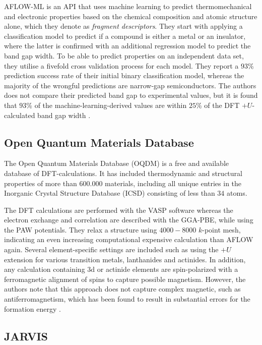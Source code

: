 AFLOW-ML \cite{Isayev2017} is an API that uses machine learning to predict thermomechanical and electronic properties based on the chemical composition and atomic structure alone, which they denote as \textit{fragment descriptors}. They start with applying a classification model to predict if a compound is either a metal or an insulator, where the latter is confirmed with an additional regression model to predict the band gap width. To be able to predict properties on an independent data set, they utilise a fivefold cross validation process for each model. They report a $93$\% prediction success rate of their initial binary classification model, whereas the majority of the wrongful predictions are narrow-gap semiconductors. The authors does not compare their predicted band gap to experimental values, but it is found that $93$\% of the machine-learning-derived values are within $25$\% of the DFT $+U$-calculated band gap width \cite{Ferrenti2020}.


\subsection{Open Quantum Materials Database}

The Open Quantum Materials Database (OQDM) \cite{Saal2013, Kirklin2015} is a free and available database of DFT-calculations. It has included thermodynamic and structural properties of more than $600.000$ materials, including all unique entries in the Inorganic Crystal Structure Database (ICSD) consisting of less than $34$ atoms.

The DFT calculations are performed with the VASP software whereas the electron exchange and correlation are described with the GGA-PBE, while using the PAW potentials. They relax a structure using $4000-8000$ $k$-point mesh, indicating an even increasing computational expensive calculation than AFLOW again. Several element-specific settings are included such as using the $+U$ extension for various transition metals, lanthanides and actinides. In addition, any calculation containing 3d or actinide elements are spin-polarized with a ferromagnetic alignment of spins to capture possible magnetism. However, the authors note that this approach does not capture complex magnetic, such as antiferromagnetism, which has been found to result in substantial errors for the formation energy \cite{Stevanovic2012}.

\subsection{JARVIS}

